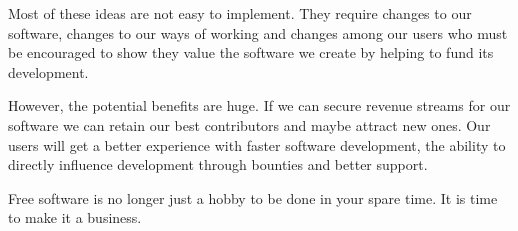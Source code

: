 Most of these ideas are not easy to implement. They require changes to our software, changes to our ways of working and changes among our users who must be encouraged to show they value the software we create by helping to fund its development.

However, the potential benefits are huge. If we can secure revenue streams for our software we can retain our best contributors and maybe attract new ones. Our users will get a better experience with faster software development, the ability to directly influence development through bounties and better support.

Free software is no longer just a hobby to be done in your spare time. It is time to make it a business.
